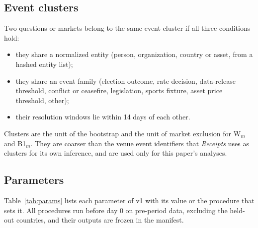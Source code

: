 \documentclass[11pt]{article}
\begin{document}
\subsection{Event clusters}\label{app:cluster}
Two questions or markets belong to the same event cluster if all three conditions hold:
\begin{itemize}
  \item they share a normalized entity (person, organization, country or asset, from a hashed entity list);
  \item they share an event family (election outcome, rate decision, data-release threshold, conflict or ceasefire, legislation, sports fixture, asset price threshold, other);
  \item their resolution windows lie within 14 days of each other.
\end{itemize}
Clusters are the unit of the bootstrap and the unit of market exclusion for W$_m$ and B1$_m$. They are coarser than the venue event identifiers that \emph{Receipts} uses as clusters for its own inference, and are used only for this paper's analyses.

\subsection{Parameters}\label{app:params}
Table~\ref{tab:params} lists each parameter of v1 with its value or the procedure that sets it. All procedures run before day 0 on pre-period data, excluding the held-out countries, and their outputs are frozen in the manifest.
\end{document}
